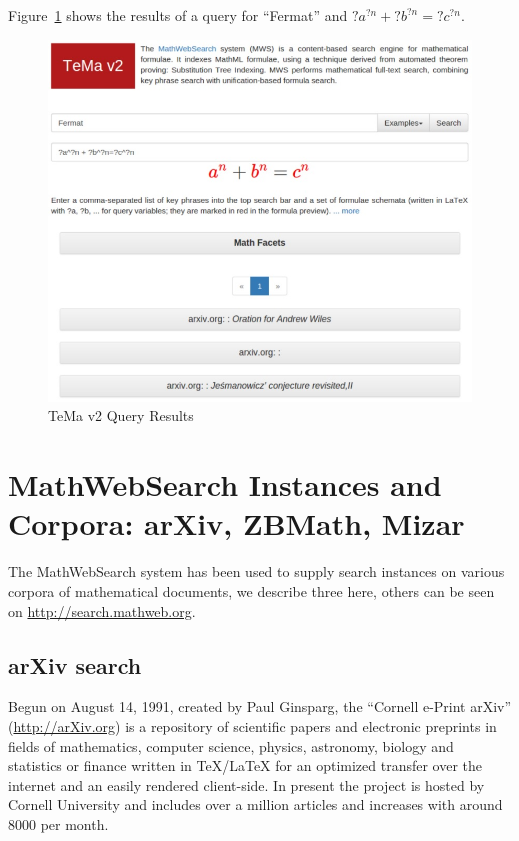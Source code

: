 \documentclass{deliverablereport}
\def\MWS{\textsf{MathWebSearch}\xspace}
\begin{document}
Figure~\ref{fig:temav2query} shows the results of a query for “Fermat” and $?a^{?n}+?b^{?n}=?c^{?n}$.
\begin{figure}[H]
\centering
 \includegraphics[scale=0.6]{figure9.jpg}
 \caption{TeMa v2 Query Results}
 \label{fig:temav2query}
\end{figure}


\section{\MWS Instances and Corpora: arXiv, ZBMath, Mizar}\label{arxiv}

The \MWS system has been used to supply search instances on various corpora of
mathematical documents, we describe three here, others can be seen on
\url{http://search.mathweb.org}. 

\subsection{arXiv search}

Begun on August 14, 1991, created by Paul Ginsparg, the ``Cornell e-Print arXiv''
(\url{http://arXiv.org}) is a repository of scientific papers and electronic preprints in
fields of mathematics, computer science, physics, astronomy, biology and statistics or
finance written in {\TeX/\LaTeX} for an optimized transfer over the internet and an easily
rendered client-side. In present the project is hosted by Cornell University and includes
over a million articles and increases with around 8000 per month.
\end{document}
